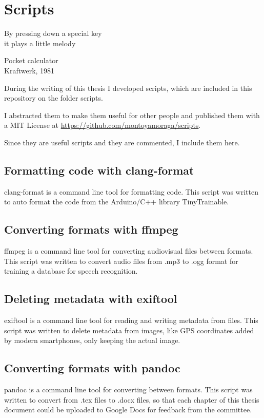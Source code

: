 \chapter{Scripts}

\epigraph{By pressing down a special key \\ it plays a little melody}{Pocket calculator \\ Kraftwerk, 1981}

During the writing of this thesis I developed scripts, which are included in this repository on the folder scripts.

I abstracted them to make them useful for other people and published them with a MIT License at \url{https://github.com/montoyamoraga/scripts}.

Since they are useful scripts and they are commented, I include them here.

\section{Formatting code with clang-format}

clang-format is a command line tool for formatting code. This script was written to auto format the code from the Arduino/C++ library TinyTrainable.



\section{Converting formats with ffmpeg}

ffmpeg is a command line tool for converting audiovisual files between formats. This script was written to convert audio files from .mp3 to .ogg format for training a database for speech recognition.



\section{Deleting metadata with exiftool}

exiftool is a command line tool for reading and writing metadata from files. This script was written to delete metadata from images, like GPS coordinates added by modern smartphones, only keeping the actual image.



\section{Converting formats with pandoc}

pandoc is a command line tool for converting between formats. This script was written to convert from .tex files to .docx files, so that each chapter of this thesis document could be uploaded to Google Docs for feedback from the committee.



